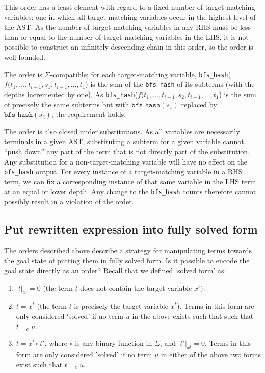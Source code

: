 This order has a least element with regard to a fixed number of target-matching variables: one in which all target-matching variables occur in the highest level of the AST. As the number of target-matching variables in any RHS must be less than or equal to the number of target-matching variables in the LHS, it is not possible to construct an infinitely descending chain in this order, so the order is well-founded.

The order is $\Sigma$-compatible; for each target-matching variable, \texttt{bfs_hash}($f(t_1,\dots,t_{i-1},s_1,t_{i-1},\dots,t_1$) is the sum of the \texttt{bfs_hash} of its subterms (with the depths incremented by one). As \texttt{bfs_hash}($f(t_1,\dots,t_{i-1},s_2,t_{i-1},\dots,t_1$) is the sum of precisely the same subterms but with $\texttt{bfs_hash}(s_1)$ replaced by $\texttt{bfs_hash}(s_2)$, the requirement holds.

The order is also closed under substitutions. As all variables are necessarily terminals in a given AST, substituting a subterm for a given variable cannot ``push down'' any part of the term that is not directly part of the substitution. Any substitution for a non-target-matching variable will have no effect on the \texttt{bfs_hash} output. For every instance of a target-matching variable in a RHS term, we can fix a corresponding instance of that same variable in the LHS term at an equal or lower depth. Any change to the \texttt{bfs_hash} counts therefore cannot possibly result in a violation of the order.

\subsection{Put rewritten expression into fully solved form}

The orders described above describe a strategy for manipulating terms towards the goal state of putting them in fully solved form. Is it possible to encode the goal state directly as an order? Recall that we defined `solved form' as:

\begin{enumerate}
  \item $|t|_{x^t} = 0$ (the term $t$ does not contain the target variable $x^t$).
  \item $t = x^t$ (the term $t$ is precisely the target variable $x^t$). Terms in this form are only considered `solved' if no term $u$ in the above exists such that such that $t =_e u$.
  \item $t = x^t \circ t'$, where $\circ$ is any binary function in $\Sigma$, and $|t'|_{x^t} = 0$. Terms in this form are only considered 'solved' if no term $u$ in either of the above two forms exist such that $t =_e u$.
\end{enumerate}

